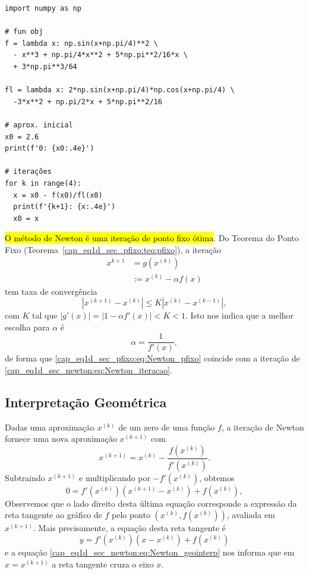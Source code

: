 \begin{ex}
\begin{lstlisting}
import numpy as np

# fun obj
f = lambda x: np.sin(x+np.pi/4)**2 \
  - x**3 + np.pi/4*x**2 + 5*np.pi**2/16*x \
  + 3*np.pi**3/64

fl = lambda x: 2*np.sin(x+np.pi/4)*np.cos(x+np.pi/4) \
  -3*x**2 + np.pi/2*x + 5*np.pi**2/16

# aprox. inicial
x0 = 2.6
print(f'0: {x0:.4e}')

# iterações
for k in range(4):
  x = x0 - f(x0)/fl(x0)
  print(f'{k+1}: {x:.4e}')
  x0 = x
\end{lstlisting}

\end{ex}

\begin{obs}
  \hl{O método de Newton é uma iteração de ponto fixo ótima}. Do Teorema do Ponto Fixo (Teorema~\ref{cap_eq1d_sec_pfixo:teo:pfixo}), a iteração
  \begin{align}
    x^{k+1} &= g(x^{(k)})\\
            &:= x^{(k)} -\alpha f(x)\label{cap_eq1d_sec_pfixo:eq:Newton_pfixo}
  \end{align}
tem taxa de convergência
\begin{equation}
  |x^{(k+1)}-x^{(k)}| \leq K |x^{(k)}-x^{(k-1)}|,
\end{equation}
com $K$ tal que $|g'(x)| = |1 - \alpha f'(x)| < K < 1$. Isto nos indica que a melhor escolha para $\alpha$ é
\begin{equation}
  \alpha = \frac{1}{f'(x)},
\end{equation}
de forma que \eqref{cap_eq1d_sec_pfixo:eq:Newton_pfixo} coincide com a iteração de \eqref{cap_eq1d_sec_newton:eq:Newton_iteracao}.
\end{obs}

\subsection{Interpretação Geométrica}

Dadas uma aproximação $x^{(k)}$ de um zero de uma função $f$, a iteração de Newton fornece uma nova aproximação $x^{(k+1)}$ com
\begin{equation}
  x^{(k+1)} = x^{(k)} - \frac{f(x^{(k)})}{f'(x^{(k)})}.
\end{equation}
Subtraindo $x^{(k+1)}$ e multiplicando por $-f'(x^{(k)})$, obtemos
\begin{equation}\label{cap_eq1d_sec_newton:eq:Newton_geointerp}
  0 = f'(x^{(k)})(x^{(k+1)}-x^{(k)}) + f(x^{(k)}),
\end{equation}
Observemos que o lado direito desta última equação corresponde a expressão da reta tangente ao gráfico de $f$ pelo ponto $(x^{(k)}, f(x^{(k)}))$, avaliada em $x^{(k+1)}$. Mais precisamente, a equação desta reta tangente é
\begin{equation}
  y = f'(x^{(k)})(x-x^{(k)}) + f(x^{(k)})
\end{equation}
e a equação \eqref{cap_eq1d_sec_newton:eq:Newton_geointerp} nos informa que em $x=x^{(k+1)}$ a reta tangente cruza o eixo $x$.

